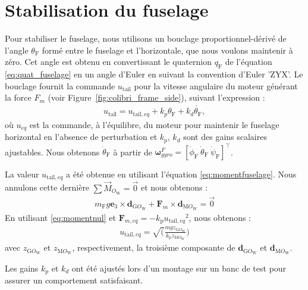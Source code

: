 \section{Stabilisation du fuselage}
\label{sec:stabfus}
Pour stabiliser le fuselage, nous utilisons un bouclage proportionnel-dérivé de l'angle $\theta_{\text{F}}$ formé entre le fuselage et l'horizontale, que nous voulons maintenir à zéro. Cet angle est obtenu en convertissant le quaternion $q_{\text{F}}$ de l'équation \eqref{eq:quat_fuselage} en un angle d'Euler en suivant la convention d'Euler 'ZYX'. Le bouclage fournit la commande $u_{\text{tail}}$ pour la vitesse angulaire du moteur générant la force $F_{m}$ (voir Figure~\ref{fig:colibri_frame_side}), suivant l'expression :
\begin{align}
    \label{eq:pidfus}
    u_{\text{tail}} = u_{\text{tail},eq} + k_{p} \theta_{\text{F}} + k_{d} \dot{\theta_{\text{F}}},
\end{align}
où $u_{eq}$ est la commande, à l'équilibre, du moteur pour maintenir le fuselage horizontal en l'absence de perturbation et $k_{p}$, $k_{d}$ sont des gains scalaires ajustables. Nous obtenons $\dot{\theta}_{\text{F}}$ à partir de $\boldsymbol{\omega}_{gyro}^{F} = [\dot{\phi}_{\text{F}}~\dot{\theta}_{\text{F}}~\dot{\psi}_{\text{F}}]^\top$.

La valeur $u_{\text{tail},eq}$ a été obtenue en utilisant l'équation \eqref{eq:momentfuselage}. Nous annulons cette dernière $\sum \overrightarrow{M}_{O_{\text{W}}} = \overrightarrow{0}$  et nous obtenons :
\begin{align}
    \label{eq:momentnul}
    m_{\text{F}} g \boldsymbol{e}_3 \times \boldsymbol{d}_{\text{G}O_{\text{W}}} + \boldsymbol{F}_{m} \times \boldsymbol{d}_{\text{M}O_{\text{W}}} = \overrightarrow{0}
\end{align}
En utilisant \eqref{eq:momentnul} et $\boldsymbol{F}_{m,eq} = - k_{\text{p}} {u_{\text{tail},eq}}^{2}$, nous obtenons :
\begin{align}
    u_{\text{tail},eq} = \sqrt(\frac{mg {z}_{\text{G}O_{\text{W}}} }{k_{\text{p}} {z}_{\text{M}O_{\text{W}}} })
\end{align}
avec ${z}_{\text{G}O_{\text{W}}}$ et ${z}_{\text{M}O_{\text{W}}}$, respectivement, la troisième composante de $\boldsymbol{d}_{\text{G}O_{\text{W}}} $ et $\boldsymbol{d}_{\text{M}O_{\text{W}}}$.

Les gains $k_{p}$ et $k_{d}$ ont été ajustés lors d'un montage sur un banc de test pour assurer un comportement satisfaisant. 

